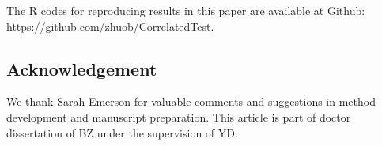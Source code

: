 The R codes for reproducing results in this paper are available at Github: 
\url{https://github.com/zhuob/CorrelatedTest}.


\subsection*{Acknowledgement}			
We thank Sarah Emerson for valuable comments and suggestions in method development and 
manuscript preparation. This article is part of doctor dissertation of BZ under the supervision 
of YD.





\newpage
